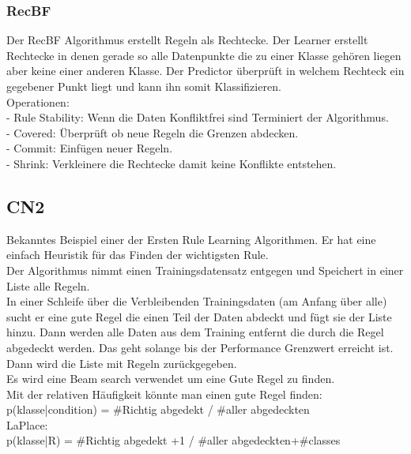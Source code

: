 \documentclass[a4paper]{scrartcl}
\begin{document}
 \subsubsection{RecBF}
 Der RecBF Algorithmus erstellt Regeln als Rechtecke. Der Learner erstellt Rechtecke in denen gerade so alle Datenpunkte die zu einer Klasse gehören liegen aber keine einer anderen Klasse. Der Predictor überprüft in welchem Rechteck ein gegebener Punkt liegt und kann ihn somit Klassifizieren.\\
 
 Operationen: \\
 - Rule Stability: Wenn die Daten Konfliktfrei sind Terminiert der Algorithmus.\\
 - Covered: Überprüft ob neue Regeln die Grenzen abdecken.\\
 - Commit: Einfügen neuer Regeln.\\
 - Shrink: Verkleinere die Rechtecke damit keine Konflikte entstehen.\\
 
 \subsection{CN2}
 Bekanntes Beispiel einer der Ersten Rule Learning Algorithmen. Er hat eine einfach Heuristik für das Finden der wichtigsten Rule.\\
 Der Algorithmus nimmt einen Trainingsdatensatz entgegen und Speichert in einer Liste alle Regeln.\\
 In einer Schleife über die Verbleibenden Trainingsdaten (am Anfang über alle) sucht er eine gute Regel die einen Teil der Daten abdeckt und fügt sie der Liste hinzu. Dann werden alle Daten aus dem Training entfernt die durch die Regel abgedeckt werden. Das geht solange bis der Performance Grenzwert erreicht ist. Dann wird die Liste mit Regeln zurückgegeben.\\
 
 Es wird eine Beam search verwendet um eine Gute Regel zu finden.\\
 
 Mit der relativen Häufigkeit könnte man einen gute Regel finden:\\
 p(klasse|condition) = \#Richtig abgedekt / \#aller abgedeckten\\
 
 LaPlace:\\
 p(klasse|R) = \#Richtig abgedekt +1 / \#aller abgedeckten+\#classes\\
 
\end{document}
